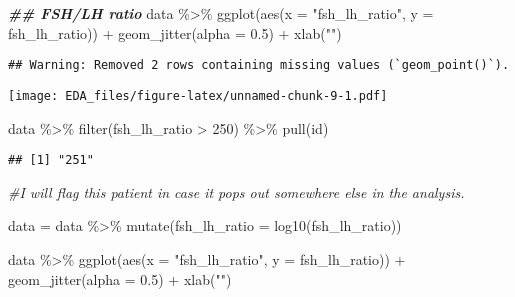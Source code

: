 \documentclass[
]{article}
\newenvironment{Shaded}{\begin{snugshade}}{\end{snugshade}}
\newcommand{\AttributeTok}[1]{\textcolor[rgb]{0.77,0.63,0.00}{#1}}
\newcommand{\CommentTok}[1]{\textcolor[rgb]{0.56,0.35,0.01}{\textit{#1}}}
\newcommand{\DecValTok}[1]{\textcolor[rgb]{0.00,0.00,0.81}{#1}}
\newcommand{\DocumentationTok}[1]{\textcolor[rgb]{0.56,0.35,0.01}{\textbf{\textit{#1}}}}
\newcommand{\FloatTok}[1]{\textcolor[rgb]{0.00,0.00,0.81}{#1}}
\newcommand{\FunctionTok}[1]{\textcolor[rgb]{0.00,0.00,0.00}{#1}}
\newcommand{\NormalTok}[1]{#1}
\newcommand{\OtherTok}[1]{\textcolor[rgb]{0.56,0.35,0.01}{#1}}
\newcommand{\SpecialCharTok}[1]{\textcolor[rgb]{0.00,0.00,0.00}{#1}}
\newcommand{\StringTok}[1]{\textcolor[rgb]{0.31,0.60,0.02}{#1}}
\begin{document}
\begin{Shaded}
\begin{Highlighting}[]
\DocumentationTok{\#\# FSH/LH ratio}
\NormalTok{data }\SpecialCharTok{\%\textgreater{}\%} 
  \FunctionTok{ggplot}\NormalTok{(}\FunctionTok{aes}\NormalTok{(}\AttributeTok{x =} \StringTok{"fsh\_lh\_ratio"}\NormalTok{, }\AttributeTok{y =}\NormalTok{ fsh\_lh\_ratio)) }\SpecialCharTok{+}
  \FunctionTok{geom\_jitter}\NormalTok{(}\AttributeTok{alpha =} \FloatTok{0.5}\NormalTok{) }\SpecialCharTok{+}
  \FunctionTok{xlab}\NormalTok{(}\StringTok{""}\NormalTok{)}
\end{Highlighting}
\end{Shaded}

\begin{verbatim}
## Warning: Removed 2 rows containing missing values (`geom_point()`).
\end{verbatim}

\texttt{[image: EDA\_files/figure-latex/unnamed-chunk-9-1.pdf]}

\begin{Shaded}
\begin{Highlighting}[]
\NormalTok{data }\SpecialCharTok{\%\textgreater{}\%} 
  \FunctionTok{filter}\NormalTok{(fsh\_lh\_ratio }\SpecialCharTok{\textgreater{}} \DecValTok{250}\NormalTok{) }\SpecialCharTok{\%\textgreater{}\%} 
  \FunctionTok{pull}\NormalTok{(id)}
\end{Highlighting}
\end{Shaded}

\begin{verbatim}
## [1] "251"
\end{verbatim}

\begin{Shaded}
\begin{Highlighting}[]
\CommentTok{\#I will flag this patient in case it pops out somewhere else in the analysis. }

\NormalTok{data }\OtherTok{=}\NormalTok{ data }\SpecialCharTok{\%\textgreater{}\%} 
  \FunctionTok{mutate}\NormalTok{(}\AttributeTok{fsh\_lh\_ratio =} \FunctionTok{log10}\NormalTok{(fsh\_lh\_ratio))}

\NormalTok{data }\SpecialCharTok{\%\textgreater{}\%} 
  \FunctionTok{ggplot}\NormalTok{(}\FunctionTok{aes}\NormalTok{(}\AttributeTok{x =} \StringTok{"fsh\_lh\_ratio"}\NormalTok{, }\AttributeTok{y =}\NormalTok{ fsh\_lh\_ratio)) }\SpecialCharTok{+}
  \FunctionTok{geom\_jitter}\NormalTok{(}\AttributeTok{alpha =} \FloatTok{0.5}\NormalTok{) }\SpecialCharTok{+}
  \FunctionTok{xlab}\NormalTok{(}\StringTok{""}\NormalTok{)}
\end{Highlighting}
\end{Shaded}
\end{document}

